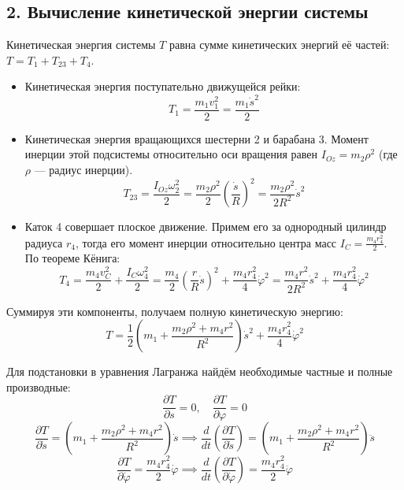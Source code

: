 \documentclass{article}
\begin{document}
\subsection*{2. Вычисление кинетической энергии системы}
Кинетическая энергия системы $T$ равна сумме кинетических энергий её частей: $T = T_1 + T_{23} + T_4$.
\begin{itemize}
	\item Кинетическая энергия поступательно движущейся рейки:
	$$ T_1 = \frac{m_1 v_1^2}{2} = \frac{m_1 \dot{s}^2}{2} $$
	\item Кинетическая энергия вращающихся шестерни 2 и барабана 3. Момент инерции этой подсистемы относительно оси вращения равен $I_{Oz} = m_2 \rho^2$ (где $\rho$ --- радиус инерции).
	$$ T_{23} = \frac{I_{Oz} \omega_2^2}{2} = \frac{m_2 \rho^2}{2} \left( \frac{\dot{s}}{R} \right)^2 = \frac{m_2 \rho^2}{2 R^2} \dot{s}^2 $$
	\item Каток 4 совершает плоское движение. Примем его за однородный цилиндр радиуса $r_4$, тогда его момент инерции относительно центра масс $I_C = \frac{m_4 r_4^2}{2}$. По теореме Кёнига:
	$$ T_4 = \frac{m_4 v_C^2}{2} + \frac{I_C \omega_4^2}{2} = \frac{m_4}{2} \left( \frac{r}{R} \dot{s} \right)^2 + \frac{m_4 r_4^2}{4} \dot{\varphi}^2 = \frac{m_4 r^2}{2 R^2} \dot{s}^2 + \frac{m_4 r_4^2}{4} \dot{\varphi}^2 $$
\end{itemize}
\par
Суммируя эти компоненты, получаем полную кинетическую энергию:
\begin{equation*}
T = \frac{1}{2} \left( m_1 + \frac{m_2 \rho^2 + m_4 r^2}{R^2} \right) \dot{s}^2 + \frac{m_4 r_4^2}{4} \dot{\varphi}^2
\end{equation*}
\par
Для подстановки в уравнения Лагранжа найдём необходимые частные и полные производные:
\begin{equation*}
\frac{\partial T}{\partial s} = 0, \quad \frac{\partial T}{\partial \varphi} = 0
\end{equation*}
\newpage
\begin{equation*}
\frac{\partial T}{\partial \dot{s}} = \left( m_1 + \frac{m_2 \rho^2 + m_4 r^2}{R^2} \right) \dot{s} \implies \frac{d}{dt} \left( \frac{\partial T}{\partial \dot{s}} \right) = \left( m_1 + \frac{m_2 \rho^2 + m_4 r^2}{R^2} \right) \ddot{s}
\end{equation*}
\begin{equation*}
\frac{\partial T}{\partial \dot{\varphi}} = \frac{m_4 r_4^2}{2} \dot{\varphi} \implies \frac{d}{dt} \left( \frac{\partial T}{\partial \dot{\varphi}} \right) = \frac{m_4 r_4^2}{2} \ddot{\varphi}
\end{equation*}
\end{document}
